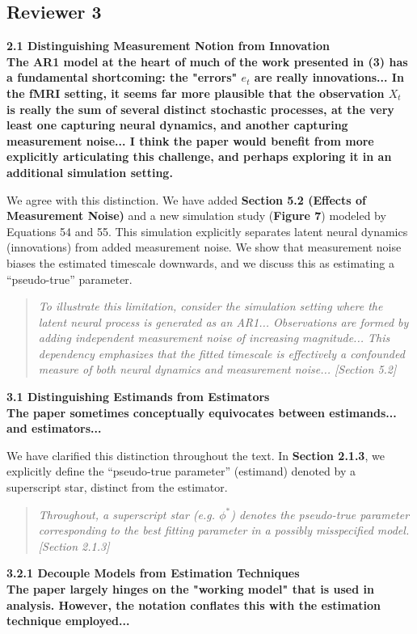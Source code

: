 \documentclass[docs/main.tex]{subfiles}
\newcommand{\reviewercomment}[1]{\vspace{0.3cm}\noindent\textbf{#1}\vspace{0.15cm}}
\newcommand{\manuscriptquote}[1]{\begin{quote}\textit{#1}\end{quote}}
\begin{document}
\subsection*{Reviewer 3}

\reviewercomment{2.1 Distinguishing Measurement Notion from Innovation\\
The AR1 model at the heart of much of the work presented in (3) has a fundamental shortcoming: the "errors" $e_t$ are really innovations... In the fMRI setting, it seems far more plausible that the observation $X_t$ is really the sum of several distinct stochastic processes, at the very least one capturing neural dynamics, and another capturing measurement noise... I think the paper would benefit from more explicitly articulating this challenge, and perhaps exploring it in an additional simulation setting.}

We agree with this distinction. We have added \textbf{Section 5.2 (Effects of Measurement Noise)} and a new simulation study (\textbf{Figure 7}) modeled by Equations 54 and 55. This simulation explicitly separates latent neural dynamics (innovations) from added measurement noise. We show that measurement noise biases the estimated timescale downwards, and we discuss this as estimating a ``pseudo-true'' parameter.

\manuscriptquote{To illustrate this limitation, consider the simulation setting where the latent neural process is generated as an AR1... Observations are formed by adding independent measurement noise of increasing magnitude... This dependency emphasizes that the fitted timescale is effectively a confounded measure of both neural dynamics and measurement noise... [Section 5.2]}

\reviewercomment{3.1 Distinguishing Estimands from Estimators\\
The paper sometimes conceptually equivocates between estimands... and estimators...}

We have clarified this distinction throughout the text. In \textbf{Section 2.1.3}, we explicitly define the ``pseudo-true parameter'' (estimand) denoted by a superscript star, distinct from the estimator.

\manuscriptquote{Throughout, a superscript star (e.g. $\phi^*$) denotes the pseudo-true parameter corresponding to the best fitting parameter in a possibly misspecified model. [Section 2.1.3]}

\reviewercomment{3.2.1 Decouple Models from Estimation Techniques\\
The paper largely hinges on the "working model" that is used in analysis. However, the notation conflates this with the estimation technique employed...}
\end{document}
